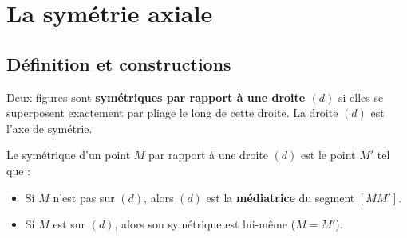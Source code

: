 \documentclass[a4paper]{book}
\begin{document}
\setcounter{chapter}{12} 
\renewcommand{\monTitre}{La symétrie axiale}
\chapter{\monTitre}
\thispagestyle{fancy}


\section{Définition et constructions}

    \begin{definition}
        Deux figures sont \textbf{symétriques par rapport à une droite $(d)$} si elles se superposent exactement par pliage le long de cette droite. La droite $(d)$ est l'axe de symétrie.
    \end{definition}
    
    
    \begin{definition}
        Le symétrique d'un point $M$ par rapport à une droite $(d)$ est le point $M'$ tel que :
        \begin{itemize}
            \item Si $M$ n'est pas sur $(d)$, alors $(d)$ est la \textbf{médiatrice} du segment $[MM']$.
            \item Si $M$ est sur $(d)$, alors son symétrique est lui-même ($M = M'$).
        \end{itemize}
    \end{definition}
    
    
    \begin{center}
    \end{center}
    
\end{document}
